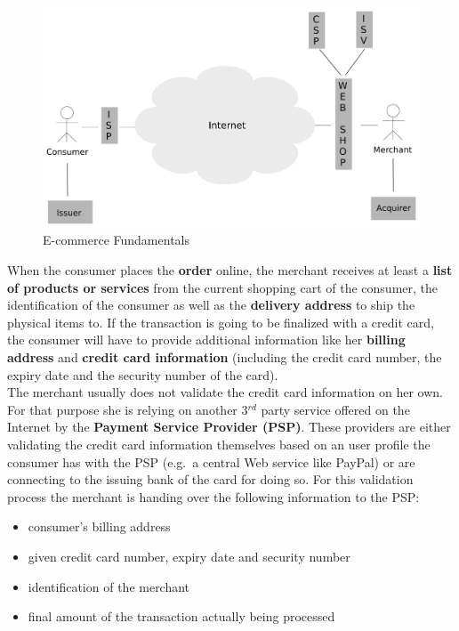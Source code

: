 \begin{figure}[H]
	\centering
		\includegraphics[width=0.8\columnwidth]{images/e-commerce-scenario.pdf}
	\caption{E-commerce Fundamentals}
\label{fig:images_ecommerce_scenario}
\end{figure}

When the consumer places the \textbf{order} online, the merchant receives at least a \textbf{list of products or services} from the current shopping cart of the consumer, the identification of the consumer as well as the \textbf{delivery address} to ship the physical items to. If the transaction is going to be finalized with a credit card, the consumer will have to provide additional information like her \textbf{billing address} and \textbf{credit card information} (including the credit card number, the expiry date and the security number of the card). \\
The merchant usually does not validate the credit card information on her own. For that purpose she is relying on another 3$^{rd}$ party service offered on the Internet by the \textbf{Payment Service Provider (\gls{PSP})}. These providers are either validating the credit card information themselves based on an user profile the consumer has with the \gls{PSP} (e.g.\ a central Web service like PayPal) or are connecting to the issuing bank of the card for doing so. For this validation process the merchant is handing over the following information to the \gls{PSP}:\@

\begin{itemize}
    \item consumer's billing address
    \item given credit card number, expiry date and security number
    \item identification of the merchant
    \item final amount of the transaction actually being processed
\end{itemize}

